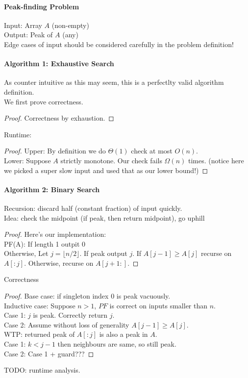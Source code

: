 \documentclass[11pt]{article}
\begin{document}
\paragraph{Peak-finding Problem}
Input: Array $A$ (non-empty) \\
Output: Peak of $A$ (any) \\
Edge cases of input should be considered carefully in the problem definition!

\paragraph{Algorithm 1: Exhaustive Search} As counter intuitive as this may seem, this is a perfectlty valid algorithm definition. \\
We first prove correctness.
\begin{proof}
    Correctness by exhaustion.
\end{proof}
Runtime:
\begin{proof}
    Upper: By definition we do $\Theta(1)$ check at most $O(n)$. \\
    Lower: Suppose $A$ strictly monotone. Our check fails $\Omega(n)$ times. (notice here we picked a super slow input and used that as our lower bound!)
\end{proof}
\paragraph{Algorithm 2: Binary Search}
Recursion: discard half (constant fraction) of input quickly. \\
Idea: check the midpoint (if peak, then return midpoint), go uphill
\begin{proof}
    Here's our implementation: \\
    PF(A): If length 1 outpit 0 \\
    Otherwise, Let $j= \lfloor n/2 \rfloor$. If peak output $j$. If $A[j-1] \geq A[j]$ recurse on $A[:j]$. Otherwise, recurse on $A[j+1:]$.
\end{proof}
Correctness
\begin{proof}
    Base case: if singleton index $0$ is peak vacuously. \\
    Inductive case: Suppose $n > 1$, $PF$ is correct on inputs smaller than $n$. \\
    Case 1: $j$ is peak. Correctly return $j$. \\
    Case 2: Assume without loss of generality $A[j-1] \geq A[j]$. \\
    WTP: returned peak of $A[:j]$ is also a peak in $A$. \\
    Case 1: $k < j-1$ then neighbours are same, so still peak. \\
    Case 2: Case 1 + guard???
\end{proof}
TODO: runtime analysis.
\end{document}
